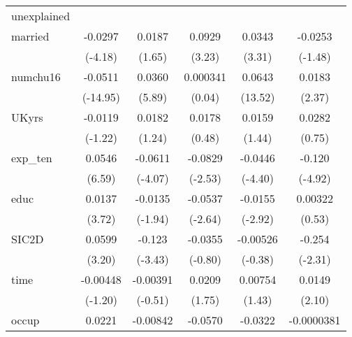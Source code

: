 \begin{table}[htbp]
\begin{tabular}{l*{5}{c}}
\hline
unexplained &                     &                     &                     &                     &                     \\
married     &     -0.0297\sym{***}&      0.0187         &      0.0929\sym{**} &      0.0343\sym{***}&     -0.0253         \\
            &     (-4.18)         &      (1.65)         &      (3.23)         &      (3.31)         &     (-1.48)         \\
numchu16    &     -0.0511\sym{***}&      0.0360\sym{***}&    0.000341         &      0.0643\sym{***}&      0.0183\sym{*}  \\
            &    (-14.95)         &      (5.89)         &      (0.04)         &     (13.52)         &      (2.37)         \\
UKyrs       &     -0.0119         &      0.0182         &      0.0178         &      0.0159         &      0.0282         \\
            &     (-1.22)         &      (1.24)         &      (0.48)         &      (1.44)         &      (0.75)         \\
exp\_ten     &      0.0546\sym{***}&     -0.0611\sym{***}&     -0.0829\sym{*}  &     -0.0446\sym{***}&      -0.120\sym{***}\\
            &      (6.59)         &     (-4.07)         &     (-2.53)         &     (-4.40)         &     (-4.92)         \\
educ        &      0.0137\sym{***}&     -0.0135         &     -0.0537\sym{**} &     -0.0155\sym{**} &     0.00322         \\
            &      (3.72)         &     (-1.94)         &     (-2.64)         &     (-2.92)         &      (0.53)         \\
SIC2D       &      0.0599\sym{**} &      -0.123\sym{***}&     -0.0355         &    -0.00526         &      -0.254\sym{*}  \\
            &      (3.20)         &     (-3.43)         &     (-0.80)         &     (-0.38)         &     (-2.31)         \\
time        &    -0.00448         &    -0.00391         &      0.0209         &     0.00754         &      0.0149\sym{*}  \\
            &     (-1.20)         &     (-0.51)         &      (1.75)         &      (1.43)         &      (2.10)         \\
occup       &      0.0221\sym{***}&    -0.00842\sym{**} &     -0.0570\sym{**} &     -0.0322\sym{***}&  -0.0000381         \\

\end{tabular}
\end{table}
